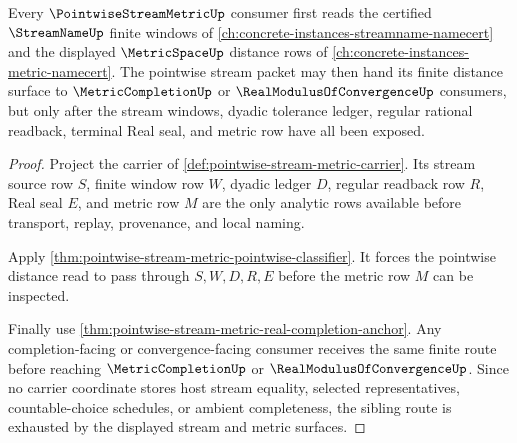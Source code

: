 \begin{theorem}
\label{thm:pointwise-stream-metric-stream-metric-sibling-route}
Every $\PointwiseStreamMetricUp$ consumer first reads the certified $\StreamNameUp$ finite windows of \autoref{ch:concrete-instances-streamname-namecert} and the displayed $\MetricSpaceUp$ distance rows of \autoref{ch:concrete-instances-metric-namecert}. The pointwise stream packet may then hand its finite distance surface to $\MetricCompletionUp$ or $\RealModulusOfConvergenceUp$ consumers, but only after the stream windows, dyadic tolerance ledger, regular rational readback, terminal Real seal, and metric row have all been exposed.
\end{theorem}
\begin{proof}
Project the carrier of \autoref{def:pointwise-stream-metric-carrier}. Its stream source row $S$, finite window row $W$, dyadic ledger $D$, regular readback row $R$, Real seal $E$, and metric row $M$ are the only analytic rows available before transport, replay, provenance, and local naming.

Apply \autoref{thm:pointwise-stream-metric-pointwise-classifier}. It forces the pointwise distance read to pass through $S,W,D,R,E$ before the metric row $M$ can be inspected.

Finally use \autoref{thm:pointwise-stream-metric-real-completion-anchor}. Any completion-facing or convergence-facing consumer receives the same finite route before reaching $\MetricCompletionUp$ or $\RealModulusOfConvergenceUp$. Since no carrier coordinate stores host stream equality, selected representatives, countable-choice schedules, or ambient completeness, the sibling route is exhausted by the displayed stream and metric surfaces.
\end{proof}
